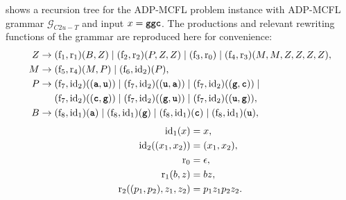 \documentclass[
    a4paper,
    12pt,
    twoside,
    BCOR=12mm,
    parskip=half,
    chapterprefix,
    numbers=noenddot,
    bibliography=totoc
]{scrbook}
\begin{document}
 shows a recursion tree for the ADP-MCFL problem instance with ADP-MCFL grammar $\mathcal{G}_{C2u-T}$ and input $x=\ts{ggc}$. The productions and relevant rewriting functions of the grammar are reproduced here for convenience:
\begin{align*}
	Z &\to (\op{f}_1,\op{r}_1)(B,Z) \mid (\op{f}_2,\op{r}_2)(P,Z,Z) \mid (\op{f}_3,\op{r}_0) \mid (\op{f}_4,\op{r}_3)(M,M,Z,Z,Z,Z),\\
	M &\to (\op{f}_5,\op{r}_4)(M,P) \mid (\op{f}_6,\op{id}_2)(P),\\
	P &\to (\op{f}_7,\op{id}_2)((\ts{a},\ts{u})) \mid (\op{f}_7,\op{id}_2)((\ts{u},\ts{a})) \mid (\op{f}_7,\op{id}_2)((\ts{g},\ts{c})) \mid\\
	&\mathrel{\phantom{\to}} (\op{f}_7,\op{id}_2)((\ts{c},\ts{g})) \mid (\op{f}_7,\op{id}_2)((\ts{g},\ts{u})) \mid (\op{f}_7,\op{id}_2)((\ts{u},\ts{g})),\\
	B &\to (\op{f}_8,\op{id}_1)(\ts{a}) \mid (\op{f}_8,\op{id}_1)(\ts{g}) \mid (\op{f}_8,\op{id}_1)(\ts{c}) \mid (\op{f}_8,\op{id}_1)(\ts{u}),
\end{align*}
\begin{align*}
	\mathrm{id}_1(x) &= x,\\
	\mathrm{id}_2((x_1,x_2)) &= (x_1,x_2),\\
	\mathrm{r}_0 &= \epsilon,\\
	\mathrm{r}_1(b,z) &= bz,\\
	\mathrm{r}_2((p_1,p_2),z_1,z_2) &= p_1 z_1 p_2 z_2.
\end{align*}
\end{document}
